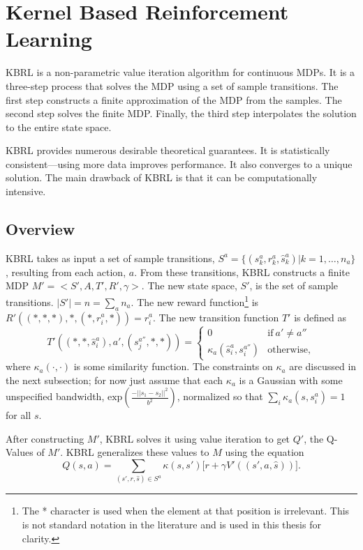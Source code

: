 \section{Kernel Based Reinforcement Learning}
KBRL \cite{kbrl} is a non-parametric value iteration algorithm for
continuous MDPs.
It is a three-step process that solves the MDP using a set of sample
transitions.
The first step constructs a finite approximation of the MDP from the samples.
The second step solves the finite MDP.
Finally, the third step interpolates the solution to the entire state space.

KBRL provides numerous desirable theoretical guarantees.
It is statistically consistent---using more data improves performance.
It also converges to a unique solution.
The main drawback of KBRL is that it can be computationally intensive.

\subsection{Overview}
KBRL takes as input a set of sample transitions, 
$S^a = \{ (s^a_k, r^a_k, \hat s^a_k) | k = 1, \ldots, n_a \}$, resulting from
each action, $a$. 
From these transitions, KBRL constructs a finite MDP $M'=<S',A,T',R',\gamma>$. 
The new state space, $S'$, is the set of sample transitions. 
$|S'| = n = \sum_a n_a$. 
The new reward function\footnote{
The * character is used when the element at that position is irrelevant.
This is not standard notation in the literature and is used in this
thesis for clarity.} is $R'((*,*,*), *, (*,r^a_i,*)) = r^a_i$.
The new transition function $T'$ is defined as 
\[
 T'((*,*,\hat s^{a}_i), a', (s^{a''}_j,*, *)) = \left\{
  \begin{array}{lr}
    0 & \mathrm{if}\ a' \neq a'' \\
    \kappa_a(\hat s^a_i, s^{a''}_i) &  \mathrm{otherwise,}
  \end{array}
\right.
\]
where $\kappa_a(\cdot, \cdot)$ is some similarity function.
The constraints on $\kappa_a$ are discussed in the next subsection; for now
just assume that each $\kappa_a$ is a Gaussian with some unspecified
bandwidth, $\mathrm{exp}(\frac{-||s_1-s_2||^2}{b^2})$, normalized so that
$\sum_i \kappa_a(s,s^a_i) = 1$ for all $s$.

After constructing $M'$, KBRL solves it using value iteration to get $Q'$,
the Q-Values of $M'$.
KBRL generalizes these values to $M$ using the equation
$$Q(s,a) = \sum_{(s',r,\hat s) \in S^a}
\kappa(s,s')\big[r + \gamma V'((s',a,\hat s))\big].$$

